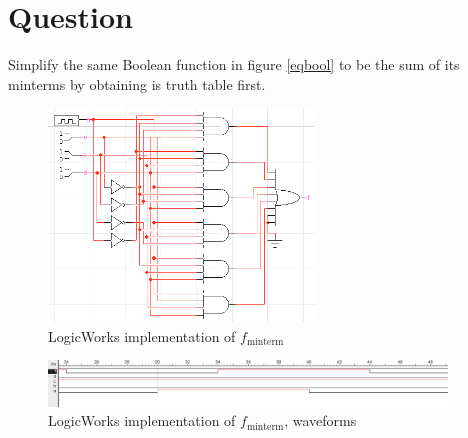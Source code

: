 \documentclass[11pt]{article}
\begin{document}
\section{Question}

Simplify the same Boolean function in figure \ref{eqbool} to be the sum of its minterms by obtaining is truth table first.

\begin{figure}[h]
	\centering
	\includegraphics[width=200pt]{mtc}
	\caption{LogicWorks implementation of $f_{\text{minterm}}$}
	\label{eqboollw2}
\end{figure}

\begin{figure}[h]
	\centering
	\includegraphics[width=300pt]{mtc-wave}
	\caption{LogicWorks implementation of $f_{\text{minterm}}$, waveforms}
	\label{eqboollw-wave2}
\end{figure}
\end{document}
